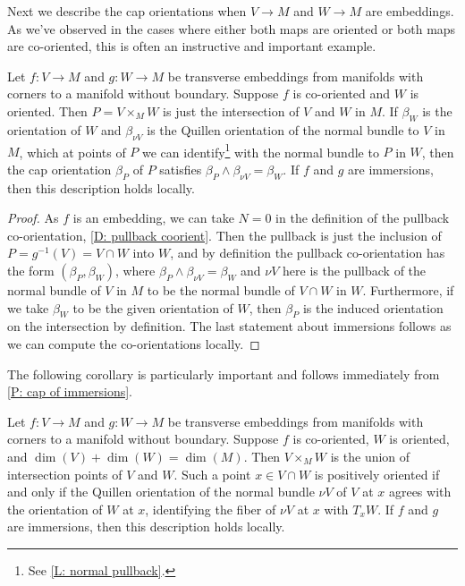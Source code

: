 Next we describe the cap orientations when $V \to M$ and $W \to M$ are embeddings.
As we've observed in the cases where either both maps are oriented or both maps are co-oriented, this is often an instructive and important example.

\begin{proposition}\label{P: cap of immersions}
	Let $f \colon V \to M$ and $g \colon W \to M$ be transverse embeddings from manifolds with corners to a manifold without boundary.
	Suppose $f$ is co-oriented and $W$ is oriented.
	Then $P = V \times_M W$ is just the intersection of $V$ and $W$ in $M$.
	If $\beta_W$ is the orientation of $W$ and $\beta_{\nu V}$ is the Quillen orientation of the normal bundle to $V$ in $M$, which at points of $P$ we can identify\footnote{See \cref{L: normal pullback}.} with the normal bundle to $P$ in $W$, then the cap orientation $\beta_P$ of $P$ satisfies $\beta_P \wedge \beta_{\nu V} = \beta_W$.
	If $f$ and $g$ are immersions, then this description holds locally.
\end{proposition}
\begin{proof}
	As $f$ is an embedding, we can take $N = 0$ in the definition of the pullback co-orientation, \cref{D: pullback coorient}.
	Then the pullback is just the inclusion of $P = g^{-1}(V) = V \cap W$ into $W$, and by definition the pullback co-orientation has the form $(\beta_P,\beta_W)$, where $\beta_P \wedge \beta_{\nu V} = \beta_W$ and $\nu V$ here is the pullback of the normal bundle of $V$ in $M$ to be the normal bundle of $V \cap W$ in $W$.
	Furthermore, if we take $\beta_W$ to be the given orientation of $W$, then $\beta_P$ is the induced orientation on the intersection by definition.
	The last statement about immersions follows as we can compute the co-orientations locally.
\end{proof}

The following corollary is particularly important and follows immediately from \cref{P: cap of immersions}.

\begin{corollary}\label{C: complementary cap}
	Let $f \colon V \to M$ and $g \colon W \to M$ be transverse embeddings from manifolds with corners to a manifold without boundary.
	Suppose $f$ is co-oriented, $W$ is oriented, and $\dim(V)+\dim(W) = \dim(M)$.
	Then $V \times_M W$ is the union of intersection points of $V$ and $W$.
	Such a point $x \in V \cap W$ is positively oriented if and only if the Quillen orientation of the normal bundle $\nu V$ of $V$ at $x$ agrees with the orientation of $W$ at $x$, identifying the fiber of $\nu V$ at $x$ with $T_xW$.
	If $f$ and $g$ are immersions, then this description holds locally.
\end{corollary}

